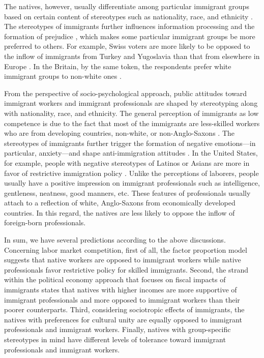 \documentclass[12pt]{article}
\begin{document}
The natives, however, usually differentiate among particular immigrant groups based on certain content of stereotypes such as nationality, race, and ethnicity \citep{LeeFiske2006}. The stereotypes of immigrants further influences information processing \citep{Vinacke1957} and the formation of prejudice \citep{BodenhausenWyer1985}, which makes some particular immigrant groups be more preferred to others. For example, Swiss voters are more likely to be opposed to the inflow of immigrants from Turkey and Yugoslavia than that from elsewhere in Europe \citep{HainmuellerHangartner2013}. In the Britain, by the same token, the respondents prefer white immigrant groups to non-white ones \citep{Ford2011}.


From the perspective of socio-psychological approach, public attitudes toward immigrant workers and immigrant professionals are shaped by stereotyping along with nationality, race, and ethnicity. The general perception of immigrants as low competence is due to the fact that most of the immigrants are less-skilled workers who are from developing countries, non-white, or non-Anglo-Saxons \citep{LeeFiske2006, ScheveSlaughter2001}. The stereotypes of immigrants further trigger the formation of negative emotions---in particular, anxiety---and shape anti-immigration attitudes \citep{BraderValentinoSuhay2008}. In the United States, for example, people with negative stereotypes of Latinos or Asians are more in favor of restrictive immigration policy \citep{ChandlerTsai2001}. Unlike the perceptions of laborers, people usually have a positive impression on immigrant professionals such as intelligence, gentleness, neatness, good manners, etc. These features of professionals usually attach to a reflection of white, Anglo-Saxons from economically developed countries. In this regard, the natives are less likely to oppose the inflow of foreign-born professionals.


In sum, we have several predictions according to the above discussions. Concerning labor market competition, first of all, the factor proportion model suggests that native workers are opposed to immigrant workers while native professionals favor restrictive policy for skilled immigrants. Second, the strand within the political economy approach that focuses on fiscal impacts of immigrants states that natives with higher incomes are more supportive of immigrant professionals and more opposed to immigrant workers than their poorer counterparts. Third, considering sociotropic effects of immigrants, the natives with preferences for cultural unity are equally opposed to immigrant professionals and immigrant workers. Finally, natives with group-specific stereotypes in mind have different levels of tolerance toward immigrant professionals and immigrant workers.
\end{document}
